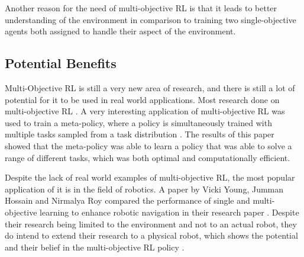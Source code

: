 Another reason for the need of multi-objective RL is that it leads to better understanding of the environment in comparison to training two single-objective agents both assigned to handle their aspect of the environment. %


\subsection{Potential Benefits}

Multi-Objective RL is still a very new area of research, and there is still a lot of potential for it to be used in real world applications. Most research done on multi-objective RL . A very interesting application of multi-objective RL was used to train a meta-policy, where a policy is simultaneously trained with multiple tasks sampled from a task distribution \cite{8968092}. The results of this paper showed that the meta-policy was able to learn a policy that was able to solve a range of different tasks, which was both optimal and computationally efficient. 

Despite the lack of real world examples of multi-objective RL, the most popular application of it is in the field of robotics. A paper by Vicki Young, Jumman Hossain and Nirmalya Roy compared the performance of single and multi-objective learning to enhance robotic navigation in their research paper \cite{young2023enhancing}. Despite their research being limited to the environment and not to an actual robot, they do intend to extend their research to a physical robot, which shows the potential and their belief in the multi-objective RL policy \cite{young2023enhancing}.